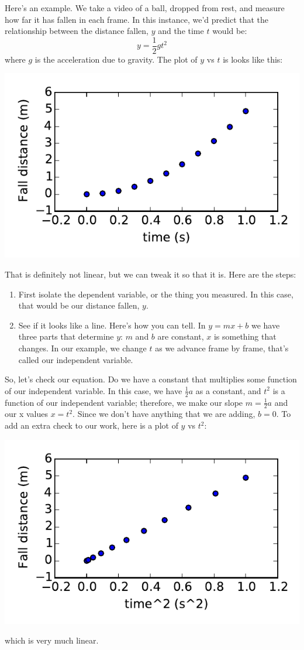 \documentclass{book}
\begin{document}
Here's an example.  We take a video of a ball, dropped from rest, and measure how far it has fallen in each frame.  In this instance, we'd predict that the relationship between the distance fallen, $y$ and the time $t$ would be:
\[y=\frac{1}{2}gt^2\]
where $g$ is the acceleration due to gravity.  The plot of $y$ vs $t$ is looks like this:
\begin{center}
\includegraphics{Lab4_figs/yvst.pdf}
\end{center}
That is definitely not linear, but we can tweak it so that it is.  Here are the steps:
\begin{enumerate}
\item First isolate the dependent variable, or the thing you measured.  In this case, that would be our distance fallen, $y$.
\item See if it looks like a line.  Here's how you can tell. In $y=mx+b$ we have three parts that determine $y$: $m$ and $b$ are constant, $x$ is something that changes.  In our example, we change $t$ as we advance frame by frame, that's called our independent variable.  
\end{enumerate}
So, let's check our equation. Do we have a constant that multiplies some function of our independent variable.  In this case, we have $\frac{1}{2}a$ as a constant, and $t^2$ is a function of our independent variable; therefore, we make our slope $m=\frac{1}{2}a$ and our x values $x=t^2$. Since we don't have anything that we are adding, $b=0$.  To add an extra check to our work, here is a plot of $y$ vs $t^2$:
\begin{center}
\includegraphics{Lab4_figs/yvst2.pdf}
\end{center}
which is very much linear.
\end{document}
